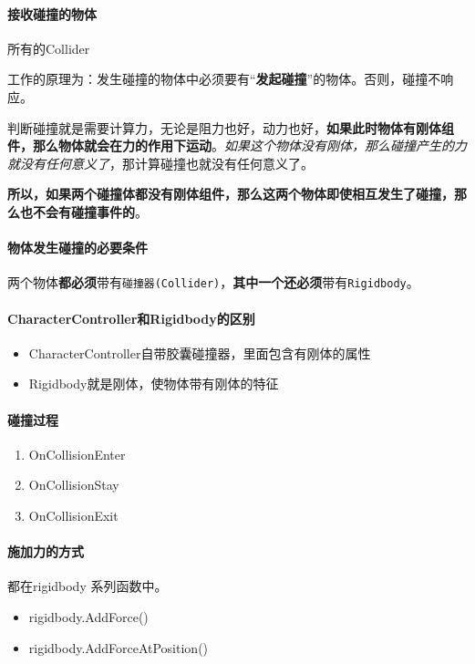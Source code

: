 \documentclass[UTF8,a4paper,12pt]{ctexbook}
\begin{document}
		\paragraph{接收碰撞的物体}
			所有的Collider
			
		工作的原理为：发生碰撞的物体中必须要有“\textbf{发起碰撞}”的物体。否则，碰撞不响应。
		
		判断碰撞就是需要计算力，无论是阻力也好，动力也好，\textbf{如果此时物体有刚体组件，那么物体就会在力的作用下运动}。\textit{如果这个物体没有刚体，那么碰撞产生的力就没有任何意义了}，那计算碰撞也就没有任何意义了。
		
		\textbf{所以，如果两个碰撞体都没有刚体组件，那么这两个物体即使相互发生了碰撞，那么也不会有碰撞事件的}。

		\paragraph{物体发生碰撞的必要条件}
			两个物体\textbf{都必须}带有\verb|碰撞器(Collider)|，\textbf{其中一个}\textbf{还必须}带有\verb|Rigidbody|。
		
		\paragraph{CharacterController和Rigidbody的区别}
			\begin{itemize}
				\item CharacterController自带胶囊碰撞器，里面包含有刚体的属性
				\item Rigidbody就是刚体，使物体带有刚体的特征
			\end{itemize}
	
		\paragraph{碰撞过程}
			\begin{enumerate}
				\item OnCollisionEnter
				\item OnCollisionStay
				\item OnCollisionExit
			\end{enumerate}
		
		\paragraph{施加力的方式}都在rigidbody 系列函数中。
			\begin{itemize}
				\item rigidbody.AddForce()
				\item rigidbody.AddForceAtPosition()
			\end{itemize}	
			
\end{document}
